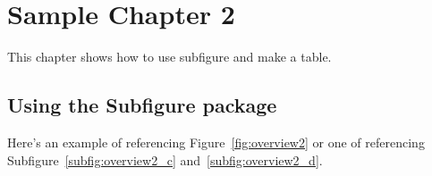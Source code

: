 \chapter{Sample Chapter 2} \label{chp:chapter2}
This chapter shows how to use subfigure and make a table.

\section{Using the Subfigure package}
Here's an example of referencing Figure~\ref{fig:overview2} or one
of referencing Subfigure~\ref{subfig:overview2_c}
and~\ref{subfig:overview2_d}.

\begin{figure}[hhhhhtb]
  \centering
   \quad
   \\
\end{figure}
